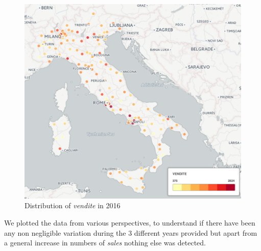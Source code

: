 \documentclass{acm_proc_article-sp}
\begin{document}
\begin{figure}[h]
\centering
\includegraphics[width=1\linewidth]{choroplet_vendite_2016.png}
\caption{Distribution of \textit{vendite} in 2016}
\end{figure}
We plotted the data from various perspectives, to understand if there have been any non negligible variation during the 3 different years provided but apart from a general increase in numbers of \textit{sales} nothing else was detected.
\end{document}
